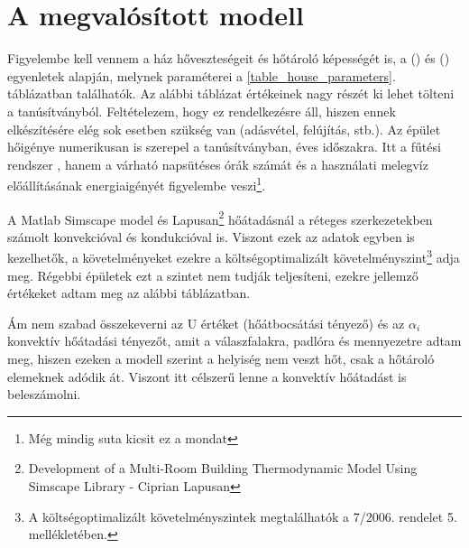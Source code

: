 

\section{A megvalósított modell}

Figyelembe kell vennem a ház hőveszteségeit és hőtároló képességét is, a () és () egyenletek alapján, melynek paraméterei a \ref{table_house_parameters}. táblázatban találhatók.
Az alábbi táblázat értékeinek nagy részét ki lehet tölteni a tanúsítványból. Feltételezem, hogy ez rendelkezésre áll, hiszen ennek elkészítésére elég sok esetben szükség van (adásvétel, felújítás, stb.).
Az épület hőigénye numerikusan is szerepel a tanúsítványban, éves időszakra. Itt a fűtési rendszer , hanem a várható napsütéses órák számát és a használati melegvíz előállításának energiaigényét figyelembe veszi\footnote{Még mindig suta kicsit ez a mondat}.

A Matlab Simscape model és Lapusan\footnote{Development of a Multi-Room Building Thermodynamic Model Using Simscape Library - Ciprian Lapusan} hőátadásnál a réteges szerkezetekben számolt konvekcióval és kondukcióval is. Viszont ezek az adatok egyben is kezelhetők, a követelményeket ezekre a költségoptimalizált követelményszint\footnote{ A  költségoptimalizált követelményszintek megtalálhatók a 7/2006. rendelet \cite{TNM2006} 5. mellékletében.} adja meg. Régebbi épületek ezt a szintet nem tudják teljesíteni, ezekre jellemző értékeket adtam meg az alábbi táblázatban. 


Ám nem szabad összekeverni az U értéket (hőátbocsátási tényező) és az $\alpha_i$ konvektív hőátadási tényezőt, amit a válaszfalakra, padlóra és mennyezetre adtam meg, hiszen ezeken a modell szerint a helyiség nem veszt hőt, csak a hőtároló elemeknek adódik át. Viszont itt célszerű lenne a konvektív hőátadást is beleszámolni. 









